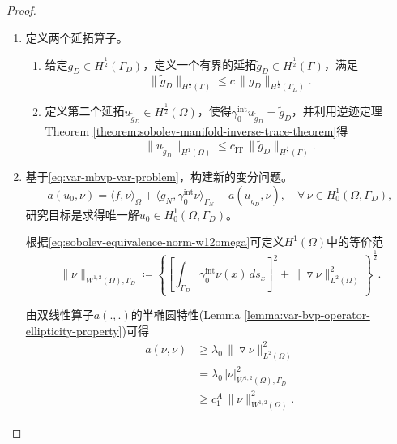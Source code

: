 \begin{proof}
\begin{enumerate}
\item 定义两个延拓算子。
  \begin{enumerate}
    \item 给定$g_{D} \in H^{\frac{1}{2}}(\Gamma_{D})$，定义一个有界的延拓$\widetilde{g}_{D} \in H^{\frac{1}{2}}(\Gamma)$，满足
    \begin{equation*}
      \big\| \widetilde{g}_{D} \big\|_{H^{\frac{1}{2}}(\Gamma)}
      \le c \, \big\| g_{D} \big\|_{H^{\frac{1}{2}}(\Gamma_{D})}.
    \end{equation*}
    \item 定义第二个延拓$u_{\widetilde{g}_D} \in H^{\frac{1}{2}}(\Omega)$，使得$\gamma_{0}^{\text{int}} u_{\widetilde{g}_D} = \widetilde{g}_D$，并利用逆迹定理Theorem \ref{theorem:sobolev-manifold-inverse-trace-theorem}得
    \begin{equation*}
      \big\| u_{\widetilde{g}_D} \big\|_{H^{1}(\Omega)}
      \le c_{\text{IT}} \,
      \big\| \widetilde{g}_D \big\|_{H^{\frac{1}{2}}(\Gamma)}.
    \end{equation*}
  \end{enumerate}

  \item 基于\eqref{eq:var-mbvp-var-problem}，构建新的变分问题。
  \begin{equation*}
    a(u_0, \nu) =
    \langle f, \nu \rangle_{\Omega}
    + \langle g_{N}, \gamma_{0}^{\text{int}} \nu \rangle_{\Gamma_{N}}
    - a(u_{\widetilde{g}_D}, \nu), \quad \forall \, \nu \in H_{0}^{1}(\Omega, \Gamma_D),
  \end{equation*}
  研究目标是求得唯一解$u_0 \in H_{0}^{1}(\Omega, \Gamma_{D})$。

  根据\eqref{eq:sobolev-equivalence-norm-w12omega}可定义$H^{1}(\Omega)$中的等价范
  \begin{equation*}
    \big\| \nu \big\|_{W^{1,2}(\Omega), \Gamma_{D}} \coloneqq
    \left\{
    \left[
    \int_{\Gamma_{D}} \gamma_{0}^{\text{int}} \nu(x) \, d s_x
    \right]^2
    + \big\| \triangledown \nu \big\|_{L^{2}(\Omega)}^2
    \right\}^{\frac{1}{2}}.
  \end{equation*}

由双线性算子$a(.,.)$的半椭圆特性(Lemma \ref{lemma:var-bvp-operator-ellipticity-property})可得
\begin{equation*}
  \begin{split}
    a(\nu,\nu) &\ge \lambda_{0} \, \big\| \triangledown \nu \big\|_{L^2(\Omega)}^2 \\
    &= \lambda_{0} \, \big| \nu \big|_{W^{1,2}(\Omega), \Gamma_{D}}^2 \\
    & \ge c_1^A \, \big\| \nu \big\|_{W^{1,2}(\Omega)}^2.
  \end{split}
\end{equation*}



\end{enumerate}
\end{proof}
